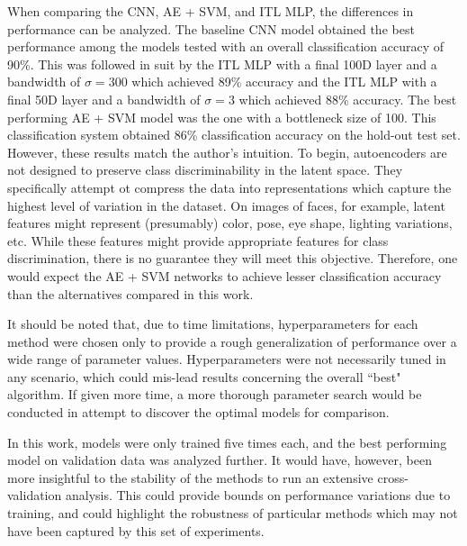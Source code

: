 \documentclass[conference]{IEEEtran}
\begin{document}
When comparing the CNN, AE + SVM, and ITL MLP, the differences in performance can be analyzed.  The baseline CNN model obtained the best performance among the models tested with an overall classification accuracy of 90\%.  This was followed in suit by the ITL MLP with a final 100D layer and a bandwidth of $\sigma=300$ which achieved 89\% accuracy and the ITL MLP with a final 50D layer and a bandwidth of $\sigma=3$ which achieved 88\% accuracy.  The best performing AE + SVM model was the one with a bottleneck size of 100.  This classification system obtained 86\% classification accuracy on the hold-out test set.  However, these results match the author's intuition.  To begin, autoencoders are not designed to preserve class discriminability in the latent space.  They specifically attempt ot compress the data into  representations which capture the highest level of variation in the dataset.  On images of faces, for example, latent features might represent (presumably) color, pose, eye shape, lighting variations, etc.  While these features might provide appropriate features for class discrimination, there is no guarantee they will meet this objective.  Therefore, one would expect the AE + SVM networks to achieve lesser classification accuracy than the alternatives compared in this work.





It should be noted that, due to time limitations, hyperparameters for each method were chosen only to provide a rough generalization of performance over a wide range of parameter values.  Hyperparameters were not necessarily tuned in any scenario, which could mis-lead results concerning the overall ``best" algorithm.  If given more time, a more thorough parameter search would be conducted in attempt to discover the optimal models for comparison.

In this work, models were only trained five times each, and the best performing model on validation data was analyzed further.  It would have, however, been more insightful to the stability of the methods to run an extensive cross-validation analysis.  This could provide bounds on performance variations due to training, and could highlight the robustness of particular methods which may not have been captured by this set of experiments.
\end{document}
